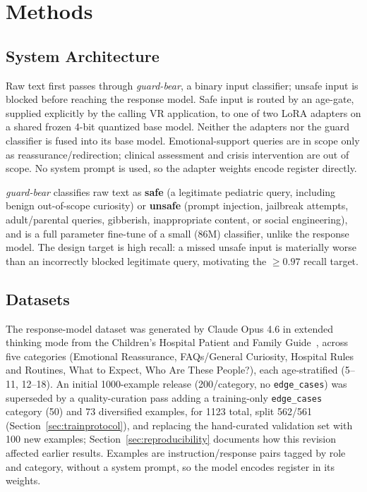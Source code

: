 \documentclass[pdflatex,sn-mathphys-num]{sn-jnl}%
\begin{document}
\section{Methods}\label{sec:methodology}

\subsection{System Architecture}\label{sec:architecture}

Raw text first passes through \textit{guard-bear}, a binary input classifier; unsafe input is blocked before reaching the response model. Safe input is routed by an age-gate, supplied explicitly by the calling VR application, to one of two LoRA adapters on a shared frozen 4-bit quantized base model. Neither the adapters nor the guard classifier is fused into its base model. Emotional-support queries are in scope only as reassurance/redirection; clinical assessment and crisis intervention are out of scope. No system prompt is used, so the adapter weights encode register directly.

\textit{guard-bear} classifies raw text as \textbf{safe} (a legitimate pediatric query, including benign out-of-scope curiosity) or \textbf{unsafe} (prompt injection, jailbreak attempts, adult/parental queries, gibberish, inappropriate content, or social engineering), and is a full parameter fine-tune of a small (86M) classifier, unlike the response model. The design target is high recall: a missed unsafe input is materially worse than an incorrectly blocked legitimate query, motivating the $\geq 0.97$ recall target.

\subsection{Datasets}\label{subsec:responsedataset}

The response-model dataset was generated by Claude Opus 4.6 in extended thinking mode from the Children's Hospital Patient and Family Guide~\cite{hospitalguide}, across five categories (Emotional Reassurance, FAQs/General Curiosity, Hospital Rules and Routines, What to Expect, Who Are These People?), each age-stratified (5--11, 12--18). An initial 1000-example release (200/category, no \texttt{edge\_cases}) was superseded by a quality-curation pass adding a training-only \texttt{edge\_cases} category (50) and 73 diversified examples, for 1123 total, split 562/561 (Section~\ref{sec:trainprotocol}), and replacing the hand-curated validation set with 100 new examples; Section~\ref{sec:reproducibility} documents how this revision affected earlier results. Examples are instruction/response pairs tagged by role and category, without a system prompt, so the model encodes register in its weights.
\end{document}
